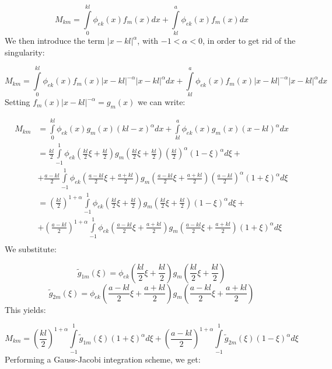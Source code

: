 \documentclass[12pt,letterpaper]{article}
\theoremstyle{definition}
\numberwithin{equation}{subsection}
\begin{document}
\begin{equation*}
    M_{km} = \int\limits_0^{kl} \phi_{ek} (x)f_m(x)dx + \int\limits_{kl}^a \phi_{ek} (x)f_m(x)dx
\end{equation*}
We then introduce the term $|x - kl|^{\alpha}$, with $-1<\alpha<0$, in order to get rid of the singularity:

\begin{equation*}
    M_{km} = \int\limits_0^{kl} \phi_{ek} (x)f_m(x)|x - kl|^{-\alpha}|x - kl|^{\alpha}dx + \int\limits_{kl}^a \phi_{ek} (x)f_m(x)|x - kl|^{-\alpha}|x - kl|^{\alpha}dx
\end{equation*}
Setting $f_m(x) |x-kl|^{-\alpha} = g_m(x)$ we can write:

\begin{align*}
    M_{km} &= \int\limits_0^{kl} \phi_{ek} (x)g_m(x)(kl-x)^{\alpha}dx + \int\limits_{kl}^a \phi_{ek} (x)g_m(x)(x - kl)^{\alpha}dx\\
    &= \frac{kl}{2}\int\limits_{-1}^1 \phi_{ek}\left(\frac{kl}{2}\xi + \frac{kl}{2}\right)g_m\left(\frac{kl}{2}\xi + \frac{kl}{2}\right) \left(\frac{kl}{2}\right)^{\alpha}(1-\xi)^{\alpha}d\xi + \\
    &+ \frac{a-kl}{2} \int\limits_{-1}^1\phi_{ek}\left(\frac{a-kl}{2}\xi + \frac{a+kl}{2}\right)g_m\left(\frac{a-kl}{2}\xi + \frac{a+kl}{2}\right) \left(\frac{a-kl}{2}\right)^{\alpha}(1+\xi)^{\alpha}d\xi \\
    &= \left(\frac{kl}{2}\right)^{1+\alpha} \int\limits_{-1}^{1}\phi_{ek}\left(\frac{kl}{2}\xi + \frac{kl}{2}\right)g_m\left(\frac{kl}{2}\xi + \frac{kl}{2}\right)(1-\xi)^{\alpha}d\xi + \\
    &+ \left(\frac{a-kl}{2}\right)^{1 + \alpha} \int\limits_{-1}^1\phi_{ek}\left(\frac{a-kl}{2}\xi + \frac{a+kl}{2}\right)g_m\left(\frac{a-kl}{2}\xi + \frac{a+kl}{2}\right) (1+\xi)^{\alpha}d\xi \\
\end{align*}
We substitute:

\begin{equation}
    \tilde g_{1m}(\xi) = \phi_{ek}\left(\frac{kl}{2}\xi + \frac{kl}{2}\right)g_m\left(\frac{kl}{2}\xi + \frac{kl}{2}\right)
\end{equation}
\begin{equation}
    \tilde g_{2m}(\xi) = \phi_{ek}\left(\frac{a-kl}{2}\xi + \frac{a+kl}{2}\right)g_m\left(\frac{a-kl}{2}\xi + \frac{a+kl}{2}\right)
\end{equation}
This yields:

\begin{equation}
    M_{km} = \left(\frac{kl}{2}\right)^{1+\alpha} \int\limits_{-1}^{1} \tilde g_{1m}(\xi) (1+\xi)^{\alpha}d\xi + \left(\frac{a-kl}{2}\right)^{1 + \alpha}\int\limits_{-1}^{1} \tilde g_{2m}(\xi) (1-\xi)^{\alpha}d\xi
\end{equation}
Performing a Gauss-Jacobi integration scheme, we get:
\end{document}
